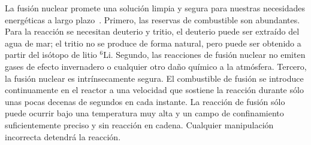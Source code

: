 La fusión nuclear promete una solución limpia y segura para nuestras necesidades energéticas a largo plazo~\cite{Freidberg:1186225}. 
Primero, las reservas de combustible son abundantes. Para la reacción se necesitan deuterio y tritio, el deuterio puede ser 
extraído del agua de mar; el tritio no se produce de forma natural, pero puede ser obtenido a partir del isótopo de litio $^6$Li. 
Segundo, las reacciones de fusión nuclear no emiten gases de efecto invernadero o cualquier otro daño químico a la atmósfera. 
Tercero, la fusión nuclear es intrínsecamente segura. El combustible de fusión se introduce continuamente en el reactor a una velocidad que sostiene la reacción durante sólo unas pocas decenas
de segundos en cada instante. La reacción de fusión sólo puede ocurrir bajo una temperatura muy alta
y un campo de confinamiento suficientemente preciso y sin reacción en cadena. Cualquier manipulación incorrecta detendrá la reacción.\par
